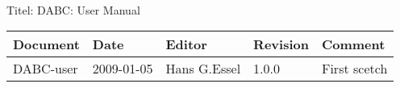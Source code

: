 \\Titel: DABC: User Manual
\begin{table}[h]
\begin{tabular}{|p{2.0cm}|p{1.9cm}|p{3.2cm}|p{1.5cm}|p{5.8cm}|} \hline
Document   & Date        & Editor       & Revision & Comment \\
\hline DABC-user & 2009-01-05 & Hans G.Essel & 1.0.0      &
First scetch \\ \hline
\end{tabular}
\end{table}
